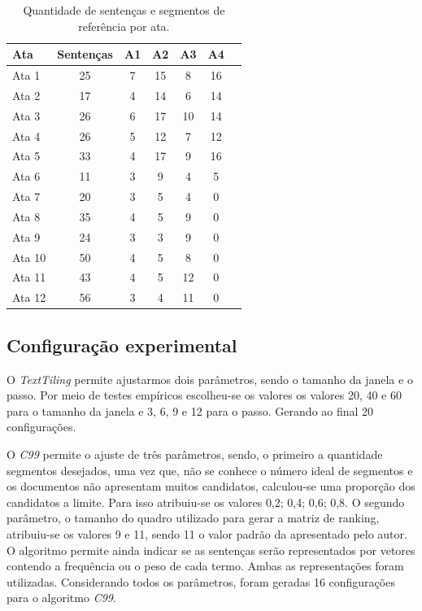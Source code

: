 \begin{table}[!h]
	\centering
	\begin{tabular}{|l|c|c|c|c|c|c|} \hline
		\textbf{Ata} & \textbf{Sentenças}  & 
		\textbf{A1}  & 
		\textbf{A2}  & 
		\textbf{A3}  & 
		\textbf{A4} \\	\hline

		Ata 1  & 25 & 7  & 15 & 8  & 16 \\ \hline 
		Ata 2  & 17 & 4  & 14 & 6  & 14 \\ \hline 
		Ata 3  & 26 & 6  & 17 & 10 & 14 \\ \hline 
		Ata 4  & 26 & 5  & 12 & 7  & 12 \\ \hline 
		Ata 5  & 33 & 4  & 17 & 9  & 16 \\ \hline 
		Ata 6  & 11 & 3  & 9  & 4  & 5  \\ \hline 
		Ata 7  & 20 & 3  & 5  & 4  & 0  \\ \hline 
		Ata 8  & 35 & 4  & 5  & 9  & 0  \\ \hline 
		Ata 9  & 24 & 3  & 3  & 9  & 0  \\ \hline 
		Ata 10 & 50 & 4  & 5  & 8  & 0  \\ \hline 
		Ata 11 & 43 & 4  & 5  & 12 & 0  \\ \hline 
		Ata 12 & 56 & 3  & 4  & 11 & 0  \\ \hline 

	\end{tabular}
	\caption{Quantidade de sentenças e segmentos de referência por ata.}
	\label{tab:segmentacaoreferencia}
\end{table}




\subsection{Configuração experimental}
\label{subsec:configuracaoexperimental}

  

O \textit{TextTiling} permite ajustarmos dois parâmetros, sendo o tamanho da janela e o passo. Por meio de testes empíricos escolheu-se os valores os valores 20, 40 e 60 para o tamanho da janela e 3, 6, 9 e 12 para o passo. Gerando ao final 20 configurações.
%

O \textit{C99} permite o ajuste de três parâmetros, sendo, o primeiro a quantidade segmentos desejados, uma vez que, não se conhece o número ideal de segmentos e os documentos não apresentam muitos candidatos, calculou-se uma proporção dos candidatos a limite. Para isso atribuiu-se os valores {0,2; 0,4; 0,6; 0,8}. O segundo parâmetro, o tamanho do quadro utilizado para gerar a matriz de ranking, atribuiu-se os valores 9 e 11, sendo 11 o valor padrão da apresentado pelo autor. O algoritmo permite ainda indicar se as sentenças serão representados por vetores contendo a frequência ou o peso de cada termo. Ambas as representações foram utilizadas. Considerando todos os parâmetros, foram geradas 16 configurações para o algoritmo \textit{C99}.


